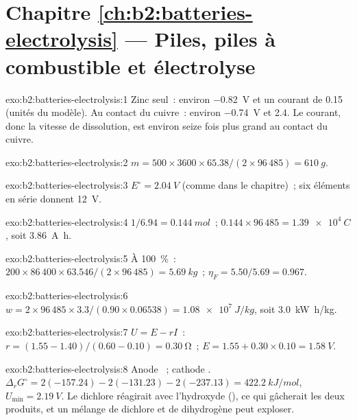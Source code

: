 \section*{Chapitre \ref{ch:b2:batteries-electrolysis} --- Piles, piles à combustible et électrolyse}

\begin{solution}{exo:b2:batteries-electrolysis:1}
Zinc seul~: environ \qty{-0.82}{V} et un courant de 0.15 (unités du modèle). Au contact du
cuivre~: environ \qty{-0.74}{V} et 2.4. Le courant, donc la vitesse de dissolution, est
environ seize fois plus grand au contact du cuivre.
\end{solution}

\begin{solution}{exo:b2:batteries-electrolysis:2}
$m = 500 \times 3600 \times 65.38/(2 \times 96\,485) = \qty{610}{g}$.
\end{solution}

\begin{solution}{exo:b2:batteries-electrolysis:3}
$E^\circ = \qty{2.04}{V}$ (comme dans le chapitre)~; six éléments en série donnent
\qty{12}{V}.
\end{solution}

\begin{solution}{exo:b2:batteries-electrolysis:4}
$1/6.94 = \qty{0.144}{mol}$~; $0.144 \times 96\,485 = \qty{1.39e4}{C}$, soit
\qty{3.86}{A.h}.
\end{solution}

\begin{solution}{exo:b2:batteries-electrolysis:5}
À 100~\%~: $200 \times 86\,400 \times 63.546/(2 \times 96\,485) = \qty{5.69}{kg}$~;
$\eta_F = 5.50/5.69 = 0.967$.
\end{solution}

\begin{solution}{exo:b2:batteries-electrolysis:6}
$w = 2 \times 96\,485 \times 3.3/(0.90 \times 0.06538) = \qty{1.08e7}{J/kg}$, soit
\qty{3.0}{kW.h/kg}.
\end{solution}

\begin{solution}{exo:b2:batteries-electrolysis:7}
$U = E - rI$~: $r = (1.55 - 1.40)/(0.60 - 0.10) = \qty{0.30}{\ohm}$~; $E = 1.55 + 0.30
\times 0.10 = \qty{1.58}{V}$.
\end{solution}

\begin{solution}{exo:b2:batteries-electrolysis:8}
Anode ~; cathode . $\Delta_r G^\circ =
2(-157.24) - 2(-131.23) - 2(-237.13) = \qty{422.2}{kJ/mol}$, $U_{\min} =
\qty{2.19}{V}$. Le dichlore réagirait avec l'hydroxyde (), ce qui gâcherait les deux produits, et un mélange de dichlore et de dihydrogène
peut exploser.
\end{solution}

